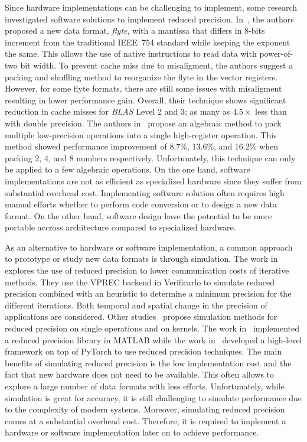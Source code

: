 Since hardware implementations can be challenging to implement, some research investigated
software solutions to implement reduced precision.
In~\cite{Anderson2016-yn}, the authors proposed a new data format, \textit{flyte},
with a mantissa that differs in 8-bits increment from the traditional IEEE~754 
standard while keeping the exponent the same.
This allows the use of native instructions to read data with power-of-two bit width.
To prevent cache miss due to misaligment, the authors suggest a packing and shuffling
method to reorganize the flyte in the vector registers.
However, for some flyte formats, there are still some issues with misaligment resulting
in lower performance gain.
Overall, their technique shows significant reduction in cache misses for \textit{BLAS}
Level 2 and 3; as many as $4.5\times$ less than with double precision.
The authors in~\cite{Zucker1994-rg} propose an algebraic method to pack multiple
low-precision operations into a single high-register operation.
This method showed performance improvement of 8.7\%, 13.6\%, and 16.2\% when packing
2, 4, and 8 numbers respectively.
Unfortunately, this technique can only be applied to a few algebraic operations.
On the one hand, software implementations are not as efficient as specialized hardware
since they suffer from substantial overhead cost.
Implementing software solution often requires high manual efforts whether to  perform
code conversion or to design a new data format.
On the other hand, software design have the potential to be more portable accross
architecture compared to specialized hardware.

As an alternative to hardware or software implementation, a common approach to 
prototype or study new data formats is through simulation.
The work in~\cite{Chatelain2019-fu} explores the use of reduced precision to 
lower communication costs of iterative methods.
They use the VPREC backend in Verificarlo to simulate reduced precision combined
with an heuristic to determine a minimum precision for the different iterations.
Both temporal and spatial change in the precision of applications are considered.
Other studies~\cite{Higham2019-yd,Zhang2019-xv} propose simulation methods for reduced
precision on single operations and on kernels.
The work in~\cite{Higham2019-yd} implemented a reduced precision library in MATLAB while 
the work in~\cite{Zhang2019-xv} developed a high-level framework on top of PyTorch to use
reduced precision techniques.
The main benefits of simulating reduced precision is the low implementation cost 
and the fact that new hardware does not need to be available.
This often allows to explore a large number of data formats with less efforts.
Unfortunately, while simulation is great for accuracy, it is still challenging to 
simulate performance due to the complexity of modern systems.
Moreover, simulating reduced precision comes at a substantial overhead cost.
Therefore, it is required to implement a hardware or software implementation later on to achieve performance.

